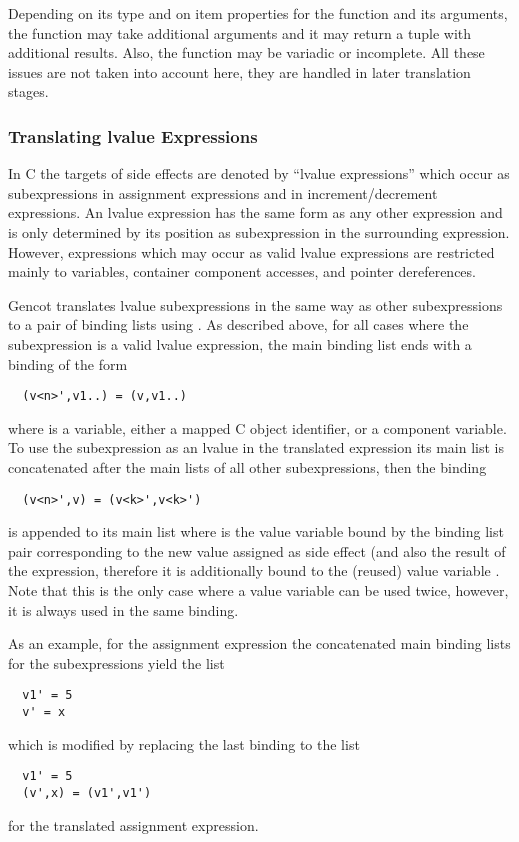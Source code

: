 Depending on its type and on item properties for the function and its arguments, the function may take additional arguments and
it may return a tuple with additional results. Also, the function may be variadic or incomplete. All these issues are not taken into
account here, they are handled in later translation stages.

\subsubsection{Translating lvalue Expressions}

In C the targets of side effects are denoted by ``lvalue expressions'' which occur as subexpressions in assignment expressions and
in increment/decrement expressions. An lvalue expression has the same form as any other expression and is only determined by its 
position as subexpression in the surrounding expression. However, expressions which may occur as valid lvalue expressions are 
restricted mainly to variables, container component accesses, and pointer dereferences.

Gencot translates lvalue subexpressions in the same way as other subexpressions to a pair of binding lists using .
As described above, for all cases where the subexpression is a valid lvalue expression, the main binding list ends with a binding
of the form
\begin{verbatim}
  (v<n>',v1..) = (v,v1..)
\end{verbatim}
where  is a variable, either a mapped C object identifier, or a component variable. To use the subexpression as an lvalue
in the translated expression its main list is concatenated after the main lists of all other subexpressions, then the binding
\begin{verbatim}
  (v<n>',v) = (v<k>',v<k>')
\end{verbatim}
is appended to its main list
where  is the value variable bound by the binding list pair corresponding to the new value assigned as side effect
(and also the result of the expression, therefore it is additionally bound to the (reused) value variable . 
Note that this is the only case where a value variable can be used twice, however, it is always used in the same binding.

As an example, for the assignment expression  the concatenated main binding lists for the subexpressions yield the
list 
\begin{verbatim}
  v1' = 5
  v' = x
\end{verbatim}
which is modified by replacing the last binding to the list
\begin{verbatim}
  v1' = 5
  (v',x) = (v1',v1')
\end{verbatim}
for the translated assignment expression.

